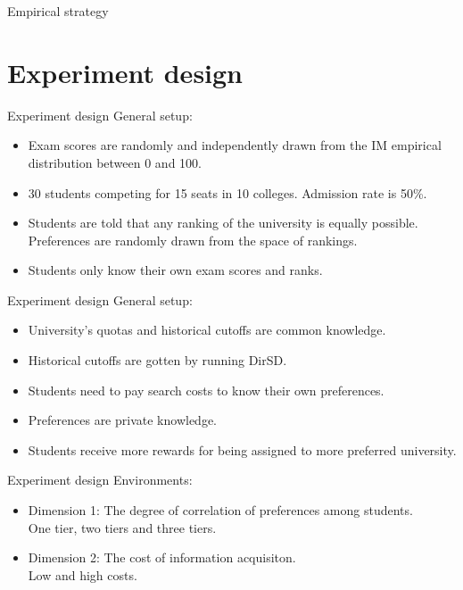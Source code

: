 \documentclass[dvipsnames,mathserif]{beamer}
\begin{document}
{\begin{frame}{Empirical strategy}
\begin{itemize}
    \end{itemize}
\end{frame}



\section{Experiment design}
\begin{frame}{Experiment design}
\large General setup:
\vspace{0.5cm}
    \begin{itemize}
        \item Exam scores are randomly and independently drawn from the IM empirical distribution between 0 and 100.
        \item 30 students competing for 15 seats in 10 colleges. Admission rate is 50\%.
        \item Students are told that any ranking of the university is equally possible. Preferences are randomly drawn from the space of rankings.
        \item Students only know their own exam scores and ranks. 

    \end{itemize}
\end{frame}

\begin{frame}{Experiment design}
\large
General setup:
\vspace{0.5cm}
    \begin{itemize}
        \item University's quotas and historical cutoffs are common knowledge. 
        \item Historical cutoffs are gotten by running DirSD.
        \item Students need to pay search costs to know their own preferences.
        \item Preferences are private knowledge.
        \item Students receive more rewards for being assigned to more preferred university.
    \end{itemize}
\end{frame}

\begin{frame}{Experiment design}
\large
Environments:
\vspace{0.5cm}
    \begin{itemize}
        \item Dimension 1: The degree of correlation of preferences among students.\\
        One tier, two tiers and three tiers.
        \item Dimension 2: The cost of information acquisiton.\\
        Low and high costs.
    \end{itemize}
\end{frame}

}
\end{document}
